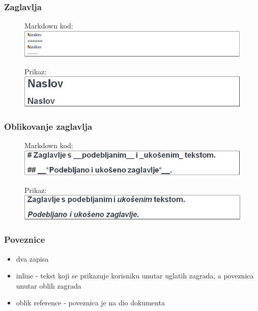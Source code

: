\documentclass{beamer}
\begin{document}
\begin{frame}
\frametitle{Zaglavlja}
\begin{figure}
{Markdown kod:} 
\includegraphics[width = 1.0\linewidth]{Zaglavlja2.png}
\end{figure}

\begin{figure}
{Prikaz:}
\includegraphics[width = 1.0\linewidth]{Prikaz_zaglavlja2.png}
\end{figure}
\end{frame}

\newpage

\begin{frame}
\frametitle{Oblikovanje zaglavlja}
\begin{figure}
{Markdown kod:} 
\includegraphics[width = 1.0\linewidth]{Oblikovanje_zaglavlja.png}
\end{figure}

\begin{figure}
{Prikaz:}
\includegraphics[width = 1.0\linewidth]{Prikaz_oblikovanja_zaglavlja.png}
\end{figure}
\end{frame}

\newpage

\begin{frame}
\frametitle{Poveznice}
\begin{itemize}
\item dva zapisa
\item inline - tekst koji se prikazuje korisniku unutar uglatih zagrada, a poveznica unutar oblih zagrada
\item oblik reference - poveznica je na dio dokumenta 

\end{itemize}
\end{frame}
\end{document}
